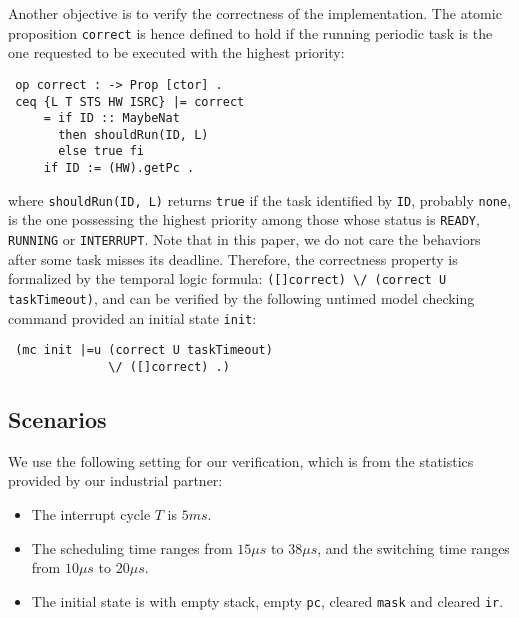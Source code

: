 \documentclass[10pt,journal]{IEEEtran}
\newcommand{\hide}[1]{\ignorespaces}
\begin{document}
Another objective is to verify the correctness of the implementation.
The atomic proposition \verb|correct| is hence defined to hold if the
running periodic task is the one requested to be executed with the
highest priority:
\begin{verbatim}
 op correct : -> Prop [ctor] .
 ceq {L T STS HW ISRC} |= correct
     = if ID :: MaybeNat 
       then shouldRun(ID, L)
       else true fi
     if ID := (HW).getPc .
\end{verbatim}
where \verb|shouldRun(ID, L)| returns \verb|true| if the task
identified by \verb|ID|, probably \verb|none|, is the one possessing
the highest priority among those whose status is \verb|READY|,
\verb|RUNNING| or \verb|INTERRUPT|. Note that in this paper, we do not
care the behaviors after some task misses its deadline. Therefore, the
correctness property is formalized by the temporal logic formula:
\verb|([]correct) \/ (correct U taskTimeout)|, and can be verified by
the following untimed model checking command provided an initial state
\verb|init|:
\begin{verbatim}
 (mc init |=u (correct U taskTimeout) 
              \/ ([]correct) .)
\end{verbatim}

\subsection{Scenarios}
\label{ss:results}
We use the following setting for our verification, which is from the 
statistics provided by our industrial partner:
\begin{itemize}
\item The interrupt cycle $T$ is $5ms$.
\item The scheduling time ranges from $15{\mu}s$ to $38{\mu}s$, and the
switching time ranges from $10{\mu}s$ to $20{\mu}s$.
\hide{\item The scheduling time ranges from $5{\mu}s$ to $9{\mu}s$, and the
switching time ranges from $2{\mu}s$ to $4{\mu}s$.}
\item The initial state is with empty stack, empty \verb|pc|, cleared 
\verb|mask| and cleared \verb|ir|.
\end{itemize}
\end{document}
